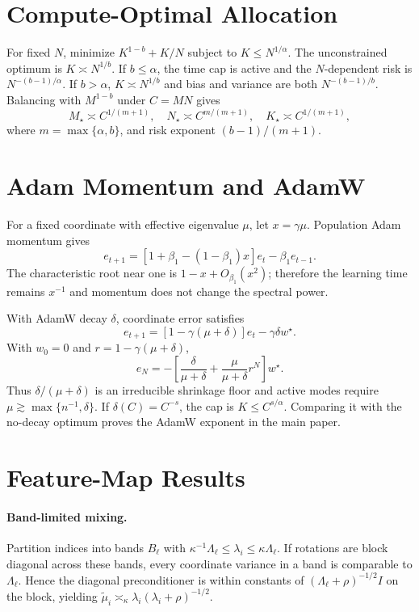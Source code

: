 \documentclass[letterpaper]{article}
\begin{document}
\section{Compute-Optimal Allocation}

For fixed $N$, minimize $K^{1-b}+K/N$ subject to $K\le N^{1/\alpha}$.  The unconstrained optimum is $K\asymp N^{1/b}$.  If $b\le\alpha$, the time cap is active and the $N$-dependent risk is $N^{-(b-1)/\alpha}$.  If $b>\alpha$, $K\asymp N^{1/b}$ and bias and variance are both $N^{-(b-1)/b}$.  Balancing with $M^{1-b}$ under $C=MN$ gives
\[
 M_\star\asymp C^{1/(m+1)},\quad
 N_\star\asymp C^{m/(m+1)},\quad
 K_\star\asymp C^{1/(m+1)},
\]
where $m=\max\{\alpha,b\}$, and risk exponent $(b-1)/(m+1)$.

\section{Adam Momentum and AdamW}

For a fixed coordinate with effective eigenvalue $\mu$, let $x=\gamma\mu$.  Population Adam momentum gives
\[
 e_{t+1}=[1+\beta_1-(1-\beta_1)x]e_t-\beta_1e_{t-1}.
\]
The characteristic root near one is $1-x+O_{\beta_1}(x^2)$; therefore the learning time remains $x^{-1}$ and momentum does not change the spectral power.

With AdamW decay $\delta$, coordinate error satisfies
\[
 e_{t+1}=[1-\gamma(\mu+\delta)]e_t-\gamma\delta w^\star.
\]
With $w_0=0$ and $r=1-\gamma(\mu+\delta)$,
\[
 e_N=-\left[\frac\delta{\mu+\delta}+\frac\mu{\mu+\delta}r^N\right]w^\star.
\]
Thus $\delta/(\mu+\delta)$ is an irreducible shrinkage floor and active modes require $\mu\gtrsim\max\{n^{-1},\delta\}$.  If $\delta(C)=C^{-s}$, the cap is $K\le C^{s/\alpha}$.  Comparing it with the no-decay optimum proves the AdamW exponent in the main paper.

\section{Feature-Map Results}

\paragraph{Band-limited mixing.}
Partition indices into bands $B_\ell$ with $\kappa^{-1}\Lambda_\ell\le\lambda_i\le\kappa\Lambda_\ell$.  If rotations are block diagonal across these bands, every coordinate variance in a band is comparable to $\Lambda_\ell$.  Hence the diagonal preconditioner is within constants of $(\Lambda_\ell+\rho)^{-1/2}I$ on the block, yielding $\widetilde\mu_i\asymp_\kappa\lambda_i(\lambda_i+\rho)^{-1/2}$.
\end{document}
